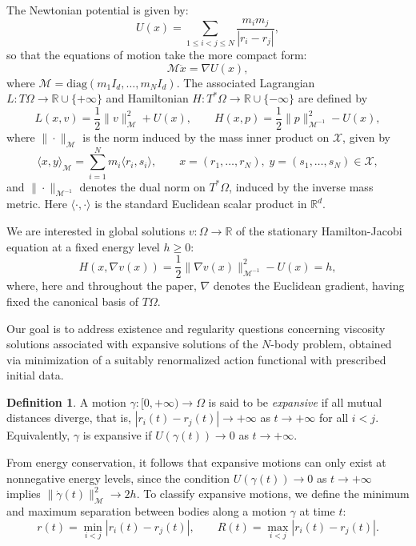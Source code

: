 \documentclass[a4paper,10pt]{amsart}
\theoremstyle{plain}
\theoremstyle{definition}
\newtheorem{defn}[thm]{Definition}
\numberwithin{equation}{section}
\numberwithin{thm}{section}
\begin{document}
The Newtonian potential is given by:
\[
    U(x) = \sum_{1 \leq i < j \leq N} \frac{m_i m_j}{|r_i - r_j|},
\]
so that the equations of motion take the more compact form:
\begin{equation}\label{eq_newton}
    \mathcal{M}\ddot{x} = \nabla U(x),
\end{equation}
where $\mathcal{M} = \text{diag}(m_1 I_d, \ldots, m_N I_d)$. The associated Lagrangian $L : T\Omega \to \mathbb{R} \cup \{+\infty\}$ and Hamiltonian $H : T^*\Omega \to \mathbb{R} \cup \{-\infty\}$ are defined by
\[
    L(x,v) = \frac{1}{2} \|v\|_\mathcal{M}^2 + U(x), \qquad
    H(x,p) = \frac{1}{2} \|p\|_{\mathcal{M}^{-1}}^2 - U(x),
\]
{where $\|\cdot\|_\mathcal{M}$ is the norm induced by the mass inner product on $\mathcal{X}$, given by
\[
    \langle x, y \rangle_\mathcal{M} = \sum_{i=1}^{N} m_i \langle r_i, s_i \rangle,
    \qquad x=(r_1,\ldots,r_N),\; y=(s_1,\ldots,s_N)\in \mathcal{X},
\]
and $\|\cdot\|_{\mathcal{M}^{-1}}$ denotes the dual norm on $T^*\Omega$, induced by the inverse mass metric. Here $\langle \cdot,\cdot \rangle$ is the standard Euclidean scalar product in $\mathbb{R}^d$.}

We are interested in global solutions $v : \Omega \to \mathbb{R}$ of the stationary Hamilton-Jacobi equation at a fixed energy level $h \geq 0$:
\begin{equation}\label{eq:HJ}
   H(x,\nabla v(x))= \frac12 \|\nabla v(x)\|_{\mathcal M^{-1}}^2 - U(x)=h,
\end{equation}
where, here and throughout the paper, $\nabla$ denotes the Euclidean gradient, having fixed the canonical basis of $T\Omega$.

 Our goal is to address existence and regularity questions concerning viscosity solutions associated with expansive solutions of the $N$-body problem, obtained via minimization of a suitably renormalized action functional with prescribed initial data.


\begin{defn}
    A motion $\gamma:[0,+\infty) \rightarrow \Omega$ is said to be \emph{expansive} if all mutual distances diverge, that is, $|r_i(t)-r_j(t)| \rightarrow +\infty$ as $t \rightarrow +\infty$ for all $i < j$. Equivalently, $\gamma$ is expansive if $U(\gamma(t)) \rightarrow 0$ as $t \rightarrow +\infty$.
\end{defn}

From energy conservation, it follows that expansive motions can only exist at nonnegative energy levels, since the condition $U(\gamma(t)) \to 0$ as $t \to +\infty$ implies $\|\dot{\gamma}(t)\|_\mathcal{M}^2 \to 2h$. To classify expansive motions, we define the minimum and maximum separation between bodies along a motion $\gamma$ at time $t$:
\[
    r(t) = \min_{i<j} |r_i(t) - r_j(t)|, \qquad R(t) = \max_{i<j} |r_i(t) - r_j(t)|.
\]
\end{document}
